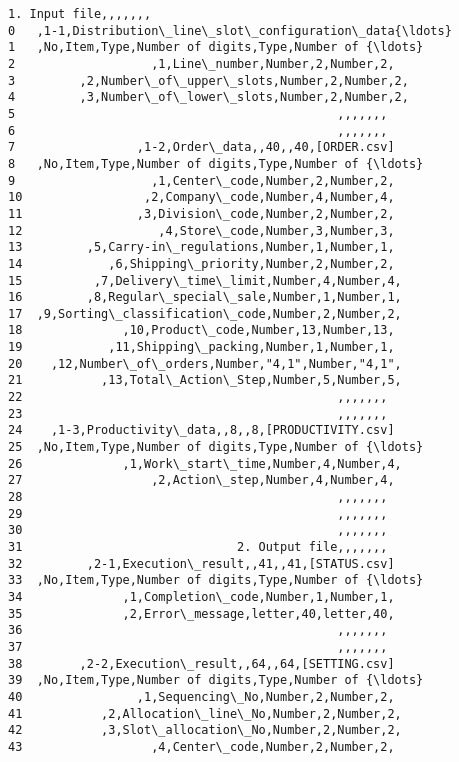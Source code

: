 \documentclass[11pt]{article}
\begin{document}
    \begin{Verbatim}[commandchars=\\\{\}]
                                 1. Input file,,,,,,,
0   ,1-1,Distribution\_line\_slot\_configuration\_data{\ldots}
1   ,No,Item,Type,Number of digits,Type,Number of {\ldots}
2                   ,1,Line\_number,Number,2,Number,2,
3         ,2,Number\_of\_upper\_slots,Number,2,Number,2,
4         ,3,Number\_of\_lower\_slots,Number,2,Number,2,
5                                             ,,,,,,,
6                                             ,,,,,,,
7                 ,1-2,Order\_data,,40,,40,[ORDER.csv]
8   ,No,Item,Type,Number of digits,Type,Number of {\ldots}
9                   ,1,Center\_code,Number,2,Number,2,
10                 ,2,Company\_code,Number,4,Number,4,
11                ,3,Division\_code,Number,2,Number,2,
12                   ,4,Store\_code,Number,3,Number,3,
13         ,5,Carry-in\_regulations,Number,1,Number,1,
14            ,6,Shipping\_priority,Number,2,Number,2,
15          ,7,Delivery\_time\_limit,Number,4,Number,4,
16         ,8,Regular\_special\_sale,Number,1,Number,1,
17  ,9,Sorting\_classification\_code,Number,2,Number,2,
18              ,10,Product\_code,Number,13,Number,13,
19            ,11,Shipping\_packing,Number,1,Number,1,
20    ,12,Number\_of\_orders,Number,"4,1",Number,"4,1",
21           ,13,Total\_Action\_Step,Number,5,Number,5,
22                                            ,,,,,,,
23                                            ,,,,,,,
24    ,1-3,Productivity\_data,,8,,8,[PRODUCTIVITY.csv]
25  ,No,Item,Type,Number of digits,Type,Number of {\ldots}
26              ,1,Work\_start\_time,Number,4,Number,4,
27                  ,2,Action\_step,Number,4,Number,4,
28                                            ,,,,,,,
29                                            ,,,,,,,
30                                            ,,,,,,,
31                              2. Output file,,,,,,,
32         ,2-1,Execution\_result,,41,,41,[STATUS.csv]
33  ,No,Item,Type,Number of digits,Type,Number of {\ldots}
34              ,1,Completion\_code,Number,1,Number,1,
35              ,2,Error\_message,letter,40,letter,40,
36                                            ,,,,,,,
37                                            ,,,,,,,
38        ,2-2,Execution\_result,,64,,64,[SETTING.csv]
39  ,No,Item,Type,Number of digits,Type,Number of {\ldots}
40                ,1,Sequencing\_No,Number,2,Number,2,
41           ,2,Allocation\_line\_No,Number,2,Number,2,
42           ,3,Slot\_allocation\_No,Number,2,Number,2,
43                  ,4,Center\_code,Number,2,Number,2,

\end{Verbatim}
\end{document}
